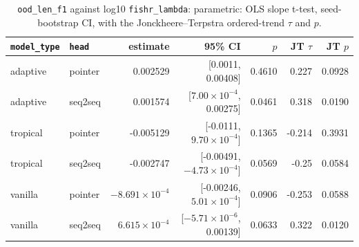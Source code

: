 \documentclass[10pt]{article}
\begin{document}
{\small
\begin{longtable}{llrrrrr}
\caption{\texttt{ood\_len\_f1} against log10 \texttt{fishr\_lambda}: parametric: OLS slope t-test, seed-bootstrap CI, with the Jonckheere--Terpstra ordered-trend $\tau$ and $p$.}\label{tab:trend-ood_len_f1}\\
\toprule
\texttt{model\_type} & \texttt{head} & estimate & 95\% CI & $p$ & JT $\tau$ & JT $p$\\
\midrule
\endhead
adaptive & pointer & 0.002529 & [0.0011, 0.00408] & 0.4610 & 0.227 & 0.0928\\
adaptive & seq2seq & 0.001574 & [$7.00\times10^{-4}$, 0.00275] & 0.0461 & 0.318 & 0.0190\\
tropical & pointer & -0.005129 & [-0.0111, $9.70\times10^{-4}$] & 0.1365 & -0.214 & 0.3931\\
tropical & seq2seq & -0.002747 & [-0.00491, $-4.73\times10^{-4}$] & 0.0569 & -0.25 & 0.0584\\
vanilla & pointer & $-8.691\times10^{-4}$ & [-0.00246, $5.01\times10^{-4}$] & 0.0906 & -0.253 & 0.0588\\
vanilla & seq2seq & $6.615\times10^{-4}$ & [$-5.71\times10^{-6}$, 0.00139] & 0.0633 & 0.322 & 0.0120\\
\bottomrule
\end{longtable}
}
\end{document}
